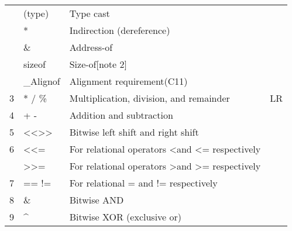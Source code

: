 \documentclass{extarticle}
\begin{document}
\begin{tabular}{|l|l|l|l|}
               & (type)                                                & Type cast                                                              &               \\
               & *                                                     & Indirection (dereference)                                              &               \\
               & \&                                                    & Address-of                                                             &               \\
               & sizeof                                                & Size-of{[}note 2{]}                                                    &               \\
               & \_Alignof                                             & Alignment requirement(C11)                                             &               \\ \hline
3              & * / \%                                                & Multiplication, division, and remainder                                & LR            \\ \hline
4              & + -                                                   & Addition and subtraction                                               &               \\ \hline
5              & \textless{}\textless \textgreater{}\textgreater{}     & Bitwise left shift and right shift                                     &               \\ \hline
6              & \textless \textless{}=                                & For relational operators \textless and \textless{}= respectively       &               \\ \hline
               & \textgreater \textgreater{}=                          & For relational operators \textgreater and \textgreater{}= respectively &               \\ \hline
7              & == !=                                                 & For relational = and != respectively                                   &               \\ \hline
8              & \&                                                    & Bitwise AND                                                            &               \\ \hline
9              & \textasciicircum{}                                    & Bitwise XOR (exclusive or)                                             &               \\ \hline

\end{tabular}
\end{document}
